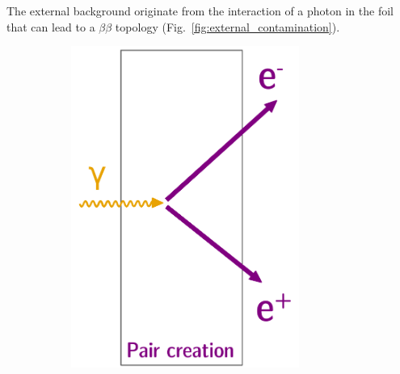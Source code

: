 The external background originate from the interaction of a photon in the foil that can lead to a $\beta\beta$ topology (Fig.~\ref{fig:external_contamination}).
\begin{figure}[!h]
\centering
\begin{subfigure}[t]{0.32\textwidth}
  \centering
  \includegraphics[width=0.82\textwidth]{SNdemonstrator/fig_SNdemonstrator/external_contamination_pair.pdf}
  \captionsetup{justification=justified}
  \caption{
    \label{subfig:ext_cont_pair}}
\end{subfigure}
\hfill
\begin{subfigure}[t]{0.32\textwidth}
  \centering

\end{subfigure}
\end{figure}

